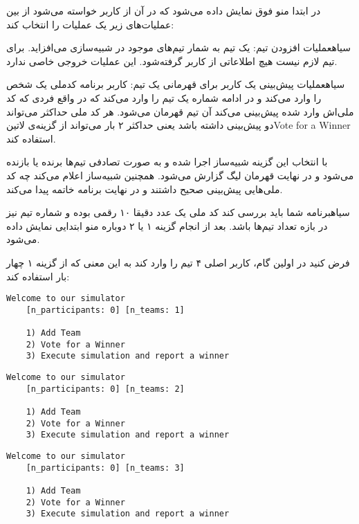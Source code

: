 \documentclass[../main.tex]{subfiles}
\begin{document}
در ابتدا منو فوق نمایش داده می‌شود
که در آن از کاربر خواسته می‌شود از بین عملیات‌های زیر یک عملیات را انتخاب کند:

 ‌سیاه{عملیات افزودن تیم}: یک تیم به شمار تیم‌های موجود در شبیه‌سازی می‌افزاید.
    برای تیم لازم نیست هیچ اطلاعاتی از کاربر گرفته‌شود. این عملیات خروجی خاصی ندارد.

 ‌سیاه{عملیات پیش‌بینی یک کاربر برای قهرمانی یک تیم}:
    کاربر برنامه کدملی یک شخص را وارد می‌کند و در ادامه شماره یک تیم را وارد می‌کند
    که در واقع فردی که کد ملی‌اش وارد شده پیش‌بینی می‌کند آن تیم قهرمان می‌شود.
    هر کد ملی حداکثر می‌تواند دو پیش‌بینی داشته باشد
    یعنی حداکثر ۲ بار می‌تواند از گزینه‌ی
    ‌لاتین{Vote for a Winner}
    استفاده کند.

 با انتخاب این گزینه شبیه‌ساز اجرا شده و به صورت تصادفی تیم‌ها برنده یا بازنده می‌شود
    و در نهایت قهرمان لیگ گزارش می‌شود.
    همچنین شبیه‌ساز اعلام می‌کند چه کد ملی‌هایی پیش‌بینی صحیح داشتند و در نهایت برنامه خاتمه پیدا می‌کند.

‌سیاه{برنامه شما باید بررسی کند کد ملی یک عدد دقیقا ۱۰ رقمی بوده و شماره تیم نیز در بازه تعداد تیم‌ها باشد}.
بعد از انجام گزینه ۱ یا ۲ دوباره منو ابتدایی نمایش داده می‌شود.


فرض کنید در اولین گام، کاربر اصلی ۴ تیم را وارد کند به این معنی که از گزینه ۱ چهار بار استفاده کند:

\begin{latin}
\begin{lstlisting}[]
    Welcome to our simulator
    [n_participants: 0] [n_teams: 1]

    1) Add Team
    2) Vote for a Winner
    3) Execute simulation and report a winner
\end{lstlisting}
\end{latin}


\begin{latin}
\begin{lstlisting}[]
    Welcome to our simulator
    [n_participants: 0] [n_teams: 2]

    1) Add Team
    2) Vote for a Winner
    3) Execute simulation and report a winner
\end{lstlisting}
\end{latin}

\begin{latin}
\begin{lstlisting}[]
    Welcome to our simulator
    [n_participants: 0] [n_teams: 3]

    1) Add Team
    2) Vote for a Winner
    3) Execute simulation and report a winner
\end{lstlisting}
\end{latin}
\end{document}
